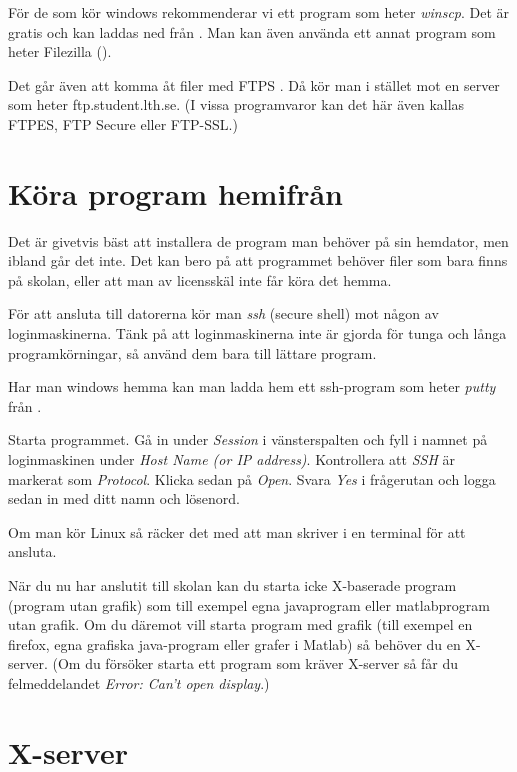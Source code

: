 \documentclass[a4paper,twocolumn]{book}
\begin{document}


För de som kör windows rekommenderar vi ett program som heter \emph{winscp}.
Det är gratis och kan laddas ned från . Man kan även
använda ett annat program som heter Filezilla
().

Det går även att komma åt filer med FTPS . Då kör man i stället mot en server
som heter ftp.student.lth.se. (I vissa programvaror kan det här även kallas
FTPES, FTP Secure eller FTP-SSL.)


\section{Köra program hemifrån}

Det är givetvis bäst att installera de program man behöver på sin hemdator,
men ibland går det inte. Det kan bero på att programmet behöver filer som bara
finns på skolan, eller att man av licensskäl inte får köra det hemma.

För att ansluta till datorerna kör man \emph{ssh} (secure shell) mot någon av
loginmaskinerna. Tänk på att loginmaskinerna inte är gjorda för tunga
och långa programkörningar, så använd dem bara till lättare program.

Har man windows hemma kan man ladda hem ett ssh-program som heter
\emph{putty} från .

Starta
programmet. Gå in under \emph{Session} i vänsterspalten och fyll i
namnet på loginmaskinen
under \emph{Host Name (or IP address)}. 
Kontrollera att \emph{SSH} är markerat som
\emph{Protocol}. Klicka
sedan på \emph{Open}. Svara \emph{Yes} i frågerutan och logga sedan in med
ditt namn och lösenord.

Om man kör Linux så räcker det med att man skriver 
 i en terminal för att ansluta.

När du nu har anslutit till skolan kan du starta icke X-baserade program
(program utan grafik) som till exempel egna javaprogram eller matlabprogram
utan grafik. 
Om du däremot vill starta program med grafik (till exempel en firefox, egna 
grafiska java-program eller grafer i Matlab) så behöver du en X-server. 
(Om du försöker starta ett program som kräver X-server så får du 
felmeddelandet \emph{Error: Can't open display}.)


\section{X-server}
\end{document}
